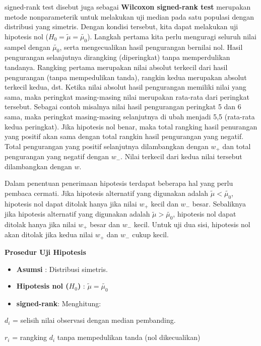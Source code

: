 \documentclass[]{book}
\providecommand{\tightlist}{%
  \setlength{\itemsep}{0pt}\setlength{\parskip}{0pt}}
\begin{document}
signed-rank test disebut juga sebagai \textbf{Wilcoxon signed-rank test}
merupakan metode nonparameterik untuk melakukan uji median pada satu
populasi dengan distribusi yang simetris. Dengan kondisi tersebut, kita
dapat melakukan uji hipotesis nol (\(H_0=\tilde{\mu}=\tilde{\mu_0}\)).
Langkah pertama kita perlu menguragi seluruh nilai sampel dengan
\(\tilde{\mu_0}\), serta mengecualikan hasil pengurangan bernilai nol.
Hasil pengurangan selanjutnya dirangking (diperingkat) tanpa
memperdulikan tandanya. Rangking pertama merupakan nilai absolut
terkecil dari hasil pengurangan (tanpa mempedulikan tanda), rangkin
kedua merupakan absolut terkecil kedua, dst. Ketika nilai absolut hasil
pengurangan memiliki nilai yang sama, maka peringkat masing-masing nilai
merupakan rata-rata dari peringkat tersebut. Sebagai contoh misalnya
nilai hasil pengurangan peringkat 5 dan 6 sama, maka peringkat
masing-masing selanjutnya di ubah menjadi 5,5 (rata-rata kedua
peringkat). Jika hipotesis nol benar, maka total rangking hasil
penurangan yang positif akan sama dengan total rangkin hasil pengurangan
yang negatif. Total pengurangan yang positif selanjutnya dilambangkan
dengan \(w_+\) dan total pengurangan yang negatif dengan \(w_-\). Nilai
terkecil dari kedua nilai tersebut dilambangkan dengan \(w\).

Dalam penentuan penerimaan hipotesis terdapat beberapa hal yang perlu
pembaca cermati. Jika hipotesis alternatif yang digunakan adalah
\(\tilde{\mu}<\tilde{\mu_0}\), hipotesis nol dapat ditolak hanya jika
nilai \(w_+\) kecil dan \(w_-\) besar. Sebaliknya jika hipotesis
alternatif yang digunakan adalah \(\tilde{\mu}>\tilde{\mu_0}\),
hipotesis nol dapat ditolak hanya jika nilai \(w_+\) besar dan \(w_-\)
kecil. Untuk uji dua sisi, hipotesis nol akan ditolak jika kedua nilai
\(w_+\) dan \(w_-\) cukup kecil.

\textbf{Prosedur Uji Hipotesis}

\begin{itemize}
\tightlist
\item
  \textbf{Asumsi} : Distribusi simetris.
\item
  \textbf{Hipotesis nol (\(H_0\))} : \(\tilde{\mu}=\tilde{\mu_0}\)
\item
  \textbf{signed-rank}: Menghitung:
\end{itemize}

\(d_i\) = selisih nilai observasi dengan median pembanding.

\(r_i\) = rangking \(d_i\) tanpa mempedulikan tanda (nol dikecualikan)
\end{document}
